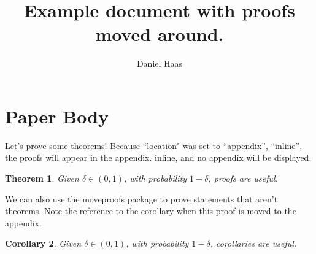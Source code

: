 \documentclass{article}
\title{Example document with proofs moved around.}
\author{Daniel Haas}
\newtheorem{theorem}{Theorem}
\newtheorem{corollary}[theorem]{Corollary}
\begin{document}
\maketitle

\section{Paper Body}
Let's prove some theorems! Because ``location" was set to \ifmoveproofstoappendix ``appendix'', \else ``inline'', \fi the proofs will appear \ifmoveproofstoappendix in the appendix. \else inline, and no appendix will be displayed. \fi


\begin{theorem}\label{theorem_one}
Given $\delta \in (0, 1)$, with probability $1 - \delta$, proofs are useful.
\end{theorem}


\vspace{0.4cm}
\noindent We can also use the moveproofs package to prove statements that aren't theorems.
Note the reference to the corollary when this proof is moved to the appendix.

\begin{corollary}\label{corollary_two}
Given $\delta \in (0, 1)$, with probability $1 - \delta$, corollaries are useful.
\end{corollary}


\appendix
{}
\end{document}
